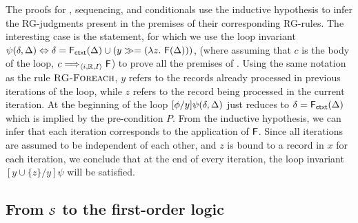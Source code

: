 The proofs for , sequencing, and conditionals use the
inductive hypothesis to infer the RG-judgments present in the
premises of their corresponding RG-rules. The interesting case is the
 statement, for which we use the loop invariant
$\psi(\delta, \Delta) \Leftrightarrow \delta = {\sf F}_{\sf ctxt}(\Delta) \cup (y \gg= (\lambda
z.~{\sf F}(\Delta)))$, (where assuming that $c$ is the body of the loop,
$c \Longrightarrow_{\langle i,\mathbb{R},I \rangle} {\sf F}$) to prove all the premises of
. Using the same notation as the rule
$\textrm{\sc {RG-Foreach}}$, $y$ refers to the records already processed
in previous iterations of the loop, while $z$ refers to the record
being processed in the current iteration.  At the beginning of the
loop $[\phi/y]\psi(\delta, \Delta)$ just reduces to $\delta = {\sf F}_{\sf ctxt}(\Delta)$ which is
implied by the pre-condition $P$. From the inductive hypothesis, we
can infer that each iteration corresponds to the application of
${\sf F}$. Since all iterations are assumed to be independent of each other,
and $z$ is bound to a record in $x$ for each iteration, we conclude
that at the end of every iteration, the loop invariant $[y \cup
  \{z\}/y]\psi$ will be satisfied.

\subsection{From $\mathcal{S}$ to the first-order logic}



